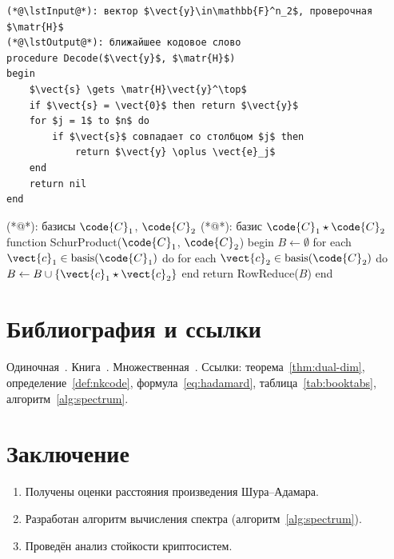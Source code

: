 \documentclass[font=modern]{cmcmsuthesis-phd}
\begin{document}
\begin{lstlisting}[style=pseudocode,caption={Декодирование}]
(*@\lstInput@*): вектор $\vect{y}\in\mathbb{F}^n_2$, проверочная $\matr{H}$
(*@\lstOutput@*): ближайшее кодовое слово
procedure Decode($\vect{y}$, $\matr{H}$)
begin
    $\vect{s} \gets \matr{H}\vect{y}^\top$
    if $\vect{s} = \vect{0}$ then return $\vect{y}$
    for $j = 1$ to $n$ do
        if $\vect{s}$ совпадает со столбцом $j$ then
            return $\vect{y} \oplus \vect{e}_j$
    end
    return nil
end
\end{lstlisting}

\begin{lstpseudocode}[caption={Произведение Шура},label={alg:schur}]
(*@\lstInput@*): базисы $\code{C}_1$, $\code{C}_2$
(*@\lstOutput@*): базис $\code{C}_1 \star \code{C}_2$
function SchurProduct($\code{C}_1$, $\code{C}_2$)
begin
    $B \gets \emptyset$
    for each $\vect{c}_1 \in \text{basis}(\code{C}_1)$ do
        for each $\vect{c}_2 \in \text{basis}(\code{C}_2)$ do
            $B \gets B \cup \{\vect{c}_1 \star \vect{c}_2\}$
    end
    return RowReduce($B$)
end
\end{lstpseudocode}

\chapter{Библиография и ссылки}
Одиночная~\cite{shannon1948}. Книга~\cite{knuth1984}.
Множественная~\cite{shannon1948,knuth1984,macwilliams1979}.
Ссылки: теорема~\ref{thm:dual-dim}, определение~\ref{def:nkcode},
формула~\eqref{eq:hadamard}, таблица~\ref{tab:booktabs},
алгоритм~\ref{alg:spectrum}.

\chapter*{Заключение}
\begin{enumerate}
\item Получены оценки расстояния произведения Шура--Адамара.
\item Разработан алгоритм вычисления спектра (алгоритм~\ref{alg:spectrum}).
\item Проведён анализ стойкости криптосистем.
\end{enumerate}

\clearpage\listoftables{}
\printbibliography[heading=bibintoc]
\end{document}
